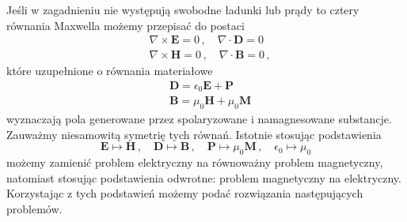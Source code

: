 \documentclass[../main.tex]{subfiles}
\begin{document}
Jeśli w zagadnieniu nie występują swobodne ładunki lub prądy to cztery równania Maxwella możemy przepisać do postaci
\begin{equation*}
\begin{split}
    &\nabla\times\mathbf{E}=0\,,\quad \nabla\cdot\mathbf{D}=0\\
    &\nabla\times\mathbf{H}=0\,,\quad \nabla\cdot\mathbf{B}=0\,,
\end{split}
\end{equation*}
które uzupełnione o równania materiałowe
\begin{equation*}
    \begin{split}
        &\mathbf{D}=\epsilon_0\mathbf{E}+\mathbf{P}\\
        &\mathbf{B}=\mu_0\mathbf{H}+\mu_0\mathbf{M}
    \end{split}
\end{equation*}
wyznaczają pola generowane przez spolaryzowane i namagnesowane substancje. Zauważmy niesamowitą symetrię tych równań. Istotnie stosując podstawienia
\begin{equation*}
    \mathbf{E}\mapsto\mathbf{H}\,,\quad\mathbf{D}\mapsto\mathbf{B}\,,\quad \mathbf{P}\mapsto\mu_0\mathbf{M}\,,\quad\epsilon_0\mapsto\mu_0
\end{equation*}
możemy zamienić problem elektryczny na równoważny problem magnetyczny, natomiast stosując podstawienia odwrotne: problem magnetyczny na elektryczny. Korzystając z tych podstawień możemy podać rozwiązania następujących problemów.
\end{document}
